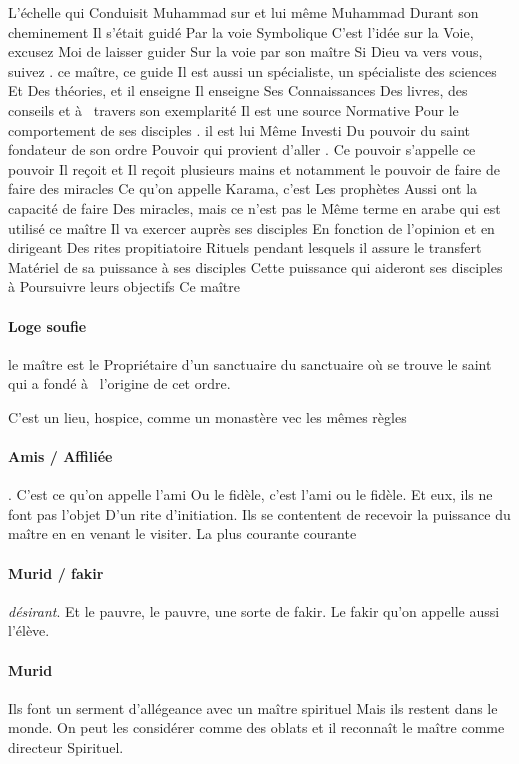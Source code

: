L'échelle qui  
Conduisit 
Muhammad sur et lui même Muhammad  Durant son cheminement 
Il s'était guidé 
Par la voie 
Symbolique  C'est l'idée sur la 
Voie, excusez 
Moi de laisser guider 
Sur la voie par son maître  Si Dieu va vers vous, suivez  . ce maître, ce guide 
Il est aussi un spécialiste, un spécialiste des sciences 
Et 
Des théories, et 
 il enseigne  Il enseigne 
Ses 
Connaissances 
Des livres, des conseils et à  travers son exemplarité 
Il est une source 
Normative 
Pour le comportement 
de ses disciples   . il est lui 
Même 
Investi 
Du pouvoir du saint fondateur de son ordre 
Pouvoir qui  provient d'aller  . 
Ce pouvoir s'appelle ce pouvoir 
Il reçoit et 
Il reçoit plusieurs mains et notamment le pouvoir de faire 
de faire des miracles 
Ce qu'on appelle Karama, c'est 
Les prophètes 
Aussi ont la capacité de faire 
Des miracles, mais ce n'est pas le 
Même terme en arabe 
qui  est utilisé 
 ce maître 
Il va exercer auprès ses disciples 
En fonction de l'opinion et en dirigeant 
Des rites propitiatoire 
Rituels pendant lesquels il assure le transfert 
Matériel 
de sa puissance 
à  ses disciples 
Cette puissance 
qui  aideront ses disciples 
à  
Poursuivre leurs objectifs 
Ce maître 

\paragraph{Loge soufie}
le maître est le 
Propriétaire d'un sanctuaire du sanctuaire où se trouve le saint 
qui  a fondé à  l'origine de cet ordre. 
\begin{Def}[hanka]
    C'est un lieu, hospice,
  comme un monastère vec les mêmes règles 
\end{Def}


\paragraph{Amis / Affiliée }. C'est ce qu'on appelle l'ami 
Ou le fidèle, c'est l'ami ou le fidèle. 
Et eux, ils ne font pas l'objet 
D'un rite d'initiation. 
Ils se contentent de recevoir la puissance du maître en en venant le visiter.
La plus courante courante

\paragraph{Murid / fakir} \textit{désirant}. Et le pauvre, le pauvre, une sorte de fakir. Le fakir qu'on appelle aussi l'élève. 

\paragraph{Murid}
Ils font un serment d'allégeance avec un maître spirituel 
Mais ils restent dans le monde. On peut les considérer comme 
des oblats et il reconnaît le maître comme directeur 
Spirituel.

